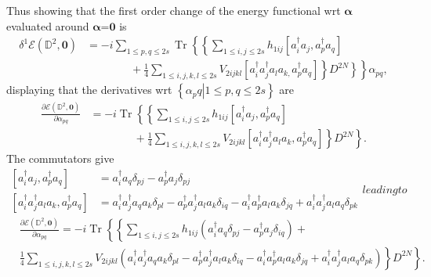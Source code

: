 \documentclass[aps,preprint]{revtex4}%
\begin{document}
Thus showing that the first order change of the energy functional wrt
$\bm{\alpha}$ evaluated around $\bm{\alpha}$=$\bm{0}$ is
\begin{align}
\delta^{1}\mathcal{E}\left(  \mathbb{D}^{2},\bm{0}\right)   &  =-i\sum_{1\leq
p,q\leq2s}\operatorname{Tr}\left\{  \left\{  \sum_{1\leq i,j\leq2s}%
h_{1ij}\left[  a_{i}^{\dagger}a_{j},a_{p}^{\dagger}a_{q}\right]  \right.
\right. \nonumber\\
&  \qquad\qquad+\left.  \left.  \frac{1}{4}\sum_{1\leq i,j,k,l\leq2s}%
V_{2ijkl}\left[  a_{i}^{\dagger}a_{j}^{\dagger}a_{l}a_{k,}a_{p}^{\dagger}%
a_{q}\right]  \right\}  \left.  D^{2N}\right\}  \right\}  \alpha_{pq},
\end{align}
displaying that the derivatives wrt $\left\{  \left.  \alpha_{p}q\right\vert
1\leq p,q\leq2s\right\}  $ are
\begin{align}
\frac{\partial\mathcal{E}\left(  \mathbb{D}^{2},\bm{0}\right)  }%
{\partial\alpha_{pq}}  &  =-i\operatorname{Tr}\left\{  \left\{  \sum_{1\leq
i,j\leq2s}h_{1ij}\left[  a_{i}^{\dagger}a_{j},a_{p}^{\dagger}a_{q}\right]
\right.  \right. \nonumber\\
&  \qquad\qquad+\left.  \left.  \frac{1}{4}\sum_{1\leq i,j,k,l\leq2s}%
V_{2ijkl}\left[  a_{i}^{\dagger}a_{j}^{\dagger}a_{l}a_{k},a_{p}^{\dagger}%
a_{q}\right]  \right\}  D^{2N}\right\}  .
\end{align}
The commutators give
\begin{subequations}
\begin{align}
\left[  a_{i}^{\dagger}a_{j},a_{p}^{\dagger}a_{q}\right]   &  =a_{i}^{\dagger
}a_{q}\delta_{pj}-a_{p}^{\dagger}a_{j}\delta_{pj}\\
\left[  a_{i}^{\dagger}a_{j}^{\dagger}a_{l}a_{k},a_{p}^{\dagger}a_{q}\right]
&  =a_{i}^{\dagger}a_{j}^{\dagger}a_{q}a_{k}\delta_{pl}-a_{p}^{\dagger}%
a_{j}^{\dagger}a_{l}a_{k}\delta_{iq}-a_{i}^{\dagger}a_{p}^{\dagger}a_{l}%
a_{k}\delta_{jq}+a_{i}^{\dagger}a_{j}^{\dagger}a_{l}a_{q}\delta_{pk}%
\end{align}
leading to
\end{subequations}
\begin{align}
&  \frac{\partial\mathcal{E}\left(  \mathbb{D}^{2},\bm{0}\right)  }%
{\partial\alpha_{pq}}=-i\operatorname{Tr}\left\{  \left\{  \sum_{1\leq
i,j\leq2s}h_{1ij}\left(  a_{i}^{\dagger}a_{q}\delta_{pj}-a_{p}^{\dagger}%
a_{j}\delta_{iq}\right)  \right.  \right.  +\nonumber\\
&  \left.  \left.  \frac{1}{4}\sum_{1\leq i,j,k,l\leq2s}V_{2ijkl}\left(
a_{i}^{\dagger}a_{j}^{\dagger}a_{q}a_{k}\delta_{pl}-a_{p}^{\dagger}%
a_{j}^{\dagger}a_{l}a_{k}\delta_{iq}-a_{i}^{\dagger}a_{p}^{\dagger}a_{l}%
a_{k}\delta_{jq}+a_{i}^{\dagger}a_{j}^{\dagger}a_{l}a_{q}\delta_{pk}\right)
\right\}  D^{2N}\right\}  .
\end{align}
\end{document}
